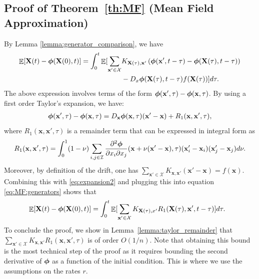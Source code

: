 \documentclass[acmsmall]{acmart}
\newcommand\bx{\mathbf{x}}
\newcommand\bX{\mathbf{X}}
\newcommand\bphi{\text{\boldmath$\phi$}}
\newcommand\calX{\mathcal{X}}
\newcommand\calI{\mathcal{I}}
\DeclareMathOperator{\E}{\mathbb{E}} %
\begin{document}

\subsection{Proof of Theorem~\ref{th:MF} (Mean Field Approximation)}
\label{sec:proof_mf}

By Lemma \ref{lemma:generator_comparison}, we have
\begin{align}
  \label{eq:MF:generators}
  \begin{split}
  \E[ \bX(t) - \bphi(\bX(0),t) ]
  = \int_0^t \E [ \sum_{\bx' \in \calX}&  K_{\bX(\tau),\bx'} \left(\bphi(\bx',t-\tau) - \bphi(\bX(\tau), t-\tau)\right) \\
  & - D_x\bphi(\bX(\tau), t-\tau)f(\bX(\tau)) ] d\tau.
  \end{split}
\end{align}
The above expression involves terms of the form $\bphi(\bx',\tau) - \bphi(\bx, \tau)$. By using a first order Taylor's expansion, we have:
\begin{align}
  \label{eq:expansion2}
  \bphi(\bx',\tau) - \bphi(\bx, \tau) = D_\bx \bphi(\bx, \tau)(\bx'-\bx) + R_1(\bx, \bx', \tau),
\end{align}
where $R_1(\bx,\bx',\tau)$ is a remainder term that can be expressed in integral form as 
\begin{align*}
  R_1(\bx,\bx',\tau) = \int_0^1 (1-\nu)\sum_{i,j\in\calI} \frac{\partial^2 \bphi}{\partial x_{i} \partial x_{j}}(\bx + \nu(\bx'-\bx) , \tau) (\bx'_i-\bx_i)(\bx'_{j}-\bx_{j}) d\nu.
\end{align*}
Moreover, by definition of the drift, one has $\sum_{\bx'\in\calX}K_{\bx,\bx'}(\bx'-\bx) = f(\bx)$. Combining this with \eqref{eq:expansion2} and plugging this into equation \eqref{eq:MF:generators} shows that
\begin{align}
  \label{eq:proof_R2}
& \E[\bX(t) - \bphi(\bX(0),t)] = \int_0^t \E[\sum_{\bx'\in\calX} K_{\bX(\tau), x'} R_1(\bX(\tau), \bx',t-\tau)]d\tau.
\end{align}
To conclude the proof, we show in Lemma~\ref{lemma:taylor_remainder} that $\sum_{\bx'\in\calX}K_{\bx,\bx'}R_1(\bx,\bx',\tau)$ is of order $O(1/n)$. Note that obtaining this bound is the most technical step of the proof as it requires bounding the second derivative of $\bphi$ as a function of the initial condition. This is where we use the assumptions on the rates $r$.
\end{document}

